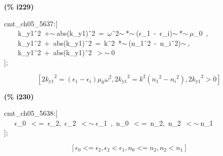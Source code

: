 \documentclass[fleqn]{article}
\begin{document}
\noindent
\begin{minipage}[t]{4.000000em}\color{red}\bfseries
(\% i229)	
\end{minipage}
\begin{minipage}[t]{\textwidth}\color{blue}
cmt\_ch05\_5637:[\\
\ \ \ \ k\_y1\^\ 2\ +\ensuremath{\sim\ }abs(k\_y1)\^\ 2\ =\ \ensuremath{\omega}\^\ 2\ensuremath{\sim\ }*\ensuremath{\sim\ }(\ensuremath{\epsilon}\_1\ -\ \ensuremath{\epsilon}\_i)\ensuremath{\sim\ }*\ensuremath{\sim\ }\ensuremath{\mu}\_0\ ,\ \\
\ \ \ \ k\_y1\^\ 2\ +\ abs(k\_y1)\^\ 2\ =\ k\^\ 2\ *\ensuremath{\sim\ }(n\_1\^\ 2\ -\ n\_i\^\ 2)\ensuremath{\sim\ },\\
\ \ \ \ k\_y1\^\ 2\ +\ abs(k\_y1)\^\ 2\ \ensuremath{>}\ensuremath{\sim\ }0\\
];
\end{minipage}
\[\displaystyle \tag{\% o229} 
\left[ 2 {{{k_{\ensuremath{\mathrm{y1}}}}}^{2}}=\left( {{\epsilon }_1}-{{\epsilon }_i}\right)  {{\mu }_0} {{\omega }^{2}}\operatorname{,}2 {{{k_{\ensuremath{\mathrm{y1}}}}}^{2}}={{k}^{2}} \left( {{{n_1}}^{2}}-{{{n_i}}^{2}}\right) \operatorname{,}2 {{{k_{\ensuremath{\mathrm{y1}}}}}^{2}}\operatorname{>  }0\right] \mbox{}
\]


\noindent
\begin{minipage}[t]{4.000000em}\color{red}\bfseries
(\% i230)	
\end{minipage}
\begin{minipage}[t]{\textwidth}\color{blue}
cmt\_ch05\_5638:[\\
\ \ \ \ensuremath{\epsilon}\_0\ \ensuremath{<}=\ \ensuremath{\epsilon}\_2,\ \ensuremath{\epsilon}\_2\ \ensuremath{<}\ensuremath{\sim\ }\ensuremath{\epsilon}\_1\ ,\ n\_0\ \ensuremath{<}=\ n\_2,\ n\_2\ \ensuremath{<}\ensuremath{\sim\ }n\_1\\
];
\end{minipage}
\[\displaystyle \tag{\% o230} 
\left[ {{\epsilon }_0}\operatorname{<  =}{{\epsilon }_2}\operatorname{,}{{\epsilon }_2}\operatorname{<  }{{\epsilon }_1}\operatorname{,}{n_0}\operatorname{<  =}{n_2}\operatorname{,}{n_2}\operatorname{<  }{n_1}\right] \mbox{}
\]
\end{document}
